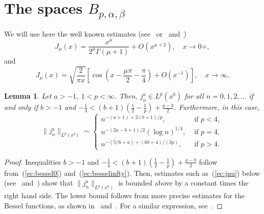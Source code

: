 \documentclass[reqno]{amsart}
\theoremstyle{plain}
\newtheorem{Lem}{Lemma}
\theoremstyle{definition}
\theoremstyle{remark}
\begin{document}
\section{The spaces $B_{p,\alpha,\beta}$}
\label{sec:Bpab}

We will use here the well known estimates (see~\cite{E-HTF}
or~\cite[Ch.~III, 3.1 (8), p.~40]{Wat} and~\cite[Ch.~VII, 7.21 (1),
p.~199]{Wat})
\begin{equation}
\label{ec:bessel0}
   J_\mu(x) = \frac{x^\mu}{2^\mu \Gamma(\mu+1)} + O(x^{\mu+2}),
   \quad x\to 0+,
\end{equation}
and
\begin{equation}
\label{ec:besselinfty}
   J_\mu(x) = \sqrt{\frac2{\pi x}}
   \left[\cos\left(x-\frac{\mu\pi}2-\frac\pi4\right) + O(x^{-1})\right],
   \quad x\to\infty.
\end{equation}

\begin{Lem}
\label{lem:normajn}
Let $a>-1$, $1 < p < \infty$. Then, $j_n^a \in L^p(x^b)$ for all
$n=0,1,2,\dots$ if and only if $b > -1$ and $-\frac14 < (b+1)\left(\frac12 -
\frac1p\right) + \frac{a-b}2$. Furthermore, in this case,
\begin{equation*}
   \|j_n^a\|_{L^p(x^b)} \sim
      \begin{cases}
        n^{-(a+1) + 2(b+1)/p},
        &\text{ if } p < 4, \\[2pt]
        n^{-(2a-b+1)/2} (\log n)^{1/4},
        &\text{ if } p = 4, \\[2pt]
        n^{-(5/6+a) + (6b + 4)/(3p)},
        &\text{ if } p > 4.
      \end{cases}
\end{equation*}
\end{Lem}

\begin{proof}
Inequalities $b > -1$ and $-\frac14 < (b+1)\left(\frac12 - \frac1p\right) +
\frac{a-b}2$ follow from~(\ref{ec:bessel0}) and~(\ref{ec:besselinfty}). Then,
estimates such as~(\ref{ec:jnu}) below (see~\cite{Bar-Cor} and~\cite{Cord}) 
show that $\|j_n^a\|_{L^p(x^b)}$ is bounded above by a constant times the
right hand side. The lower bound follows from more precise estimates for the
Bessel functions, as shown in~\cite{Bar-Cor} and~\cite{Cord}. For a similar
expression, see~\cite{Stem}.
\end{proof}
\end{document}
